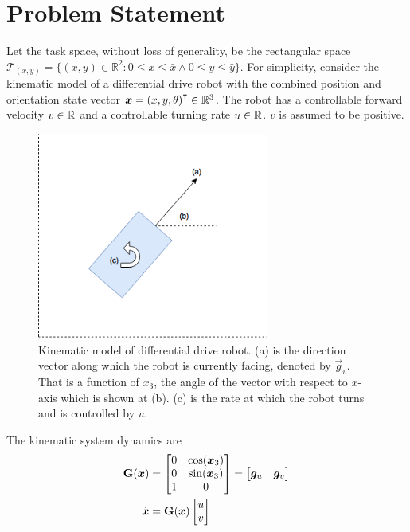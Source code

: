 \section{Problem Statement}
Let the task space, without loss of generality, be the rectangular space  $\mathcal{T}_{(\bar{x},\bar{y})} = \{(x,y)\in\mathbb{R}^2 : 0 \leq x \leq \bar{x} \wedge 0 \leq y \leq \bar{y}\}$. For simplicity, consider the kinematic model of a differential drive robot with the combined position and orientation state vector $\bm{x}={(x,y,\theta)}^{\intercal}\in\mathbb{R}^3$. The robot has a controllable forward velocity $v\in\mathbb{R}$ and a controllable turning rate $u\in\mathbb{R}$. $v$ is assumed to be positive.
\begin{figure}[!htbp]
    \centering
    \includegraphics[width=3in]{images/diffdrive_kin_model.png}
    \caption{Kinematic model of differential drive robot. (a) is the direction vector along which the robot is currently facing, denoted by $\vec{g}_v$. That is a function of $x_3$, the angle of the vector with respect to $x$-axis which is shown at (b). (c) is the rate at which the robot turns and is controlled by $u$.}
    \label{fig:basic_kinematic_model}
\end{figure}
The kinematic system dynamics are
\begin{align}
    \mathbf{G}(\bm{x}) &=
        \begin{bmatrix}
            0 & \cos(\bm{x}_3)\\
            0 & \sin(\bm{x}_3)\\
            1 & 0
        \end{bmatrix}
        =
        \begin{bmatrix}
            \bm{g}_u & \bm{g}_v
        \end{bmatrix} \nonumber \\
    \dot{\bm{x}} &=
        \mathbf{G}(\bm{x})
        \begin{bmatrix} u \\ v \end{bmatrix}.
    \label{eqn:basic_kinematic_model}
\end{align}
